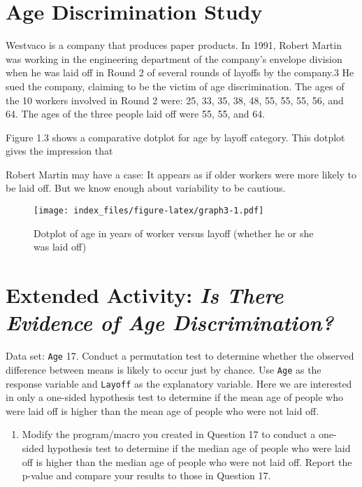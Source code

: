 \documentclass[
]{report}
\providecommand{\tightlist}{%
  \setlength{\itemsep}{0pt}\setlength{\parskip}{0pt}}
\begin{document}
\section*{Age Discrimination Study}\label{age-discrimination-study}

\normalsize

Westvaco is a company that produces paper products. In 1991, Robert Martin was working in the engineering
department of the company's envelope division when he was laid off in Round 2 of several rounds of layoffs
by the company.3 He sued the company, claiming to be the victim of age discrimination. The ages of the 10
workers involved in Round 2 were: 25, 33, 35, 38, 48, 55, 55, 55, 56, and 64. The ages of the three people
laid off were 55, 55, and 64.

Figure 1.3 shows a comparative dotplot for age by layoff category. This dotplot gives the impression that

Robert Martin may have a case: It appears as if older workers were more likely to be laid off. But we know
enough about variability to be cautious.

\begin{figure}
\centering
\texttt{[image: index\_files/figure-latex/graph3-1.pdf]}
\caption{\label{fig:graph3}Dotplot of age in years of worker versus layoff (whether he or she was laid off)}
\end{figure}

\section*{\texorpdfstring{Extended Activity: \emph{Is There Evidence of Age Discrimination?}}{Extended Activity: Is There Evidence of Age Discrimination?}}\label{extended-activity-is-there-evidence-of-age-discrimination}

Data set: \texttt{Age}
17. Conduct a permutation test to determine whether the observed difference between means is likely to
occur just by chance. Use \texttt{Age} as the response variable and \texttt{Layoff} as the explanatory variable. Here
we are interested in only a one-sided hypothesis test to determine if the mean age of people who were
laid off is higher than the mean age of people who were not laid off.

\begin{enumerate}
\def\labelenumi{\arabic{enumi}.}
\setcounter{enumi}{17}
\tightlist
\item
  Modify the program/macro you created in Question 17 to conduct a one-sided hypothesis test to determine
  if the median age of people who were laid off is higher than the median age of people who were
  not laid off. Report the p-value and compare your results to those in Question 17.
\end{enumerate}
\end{document}
